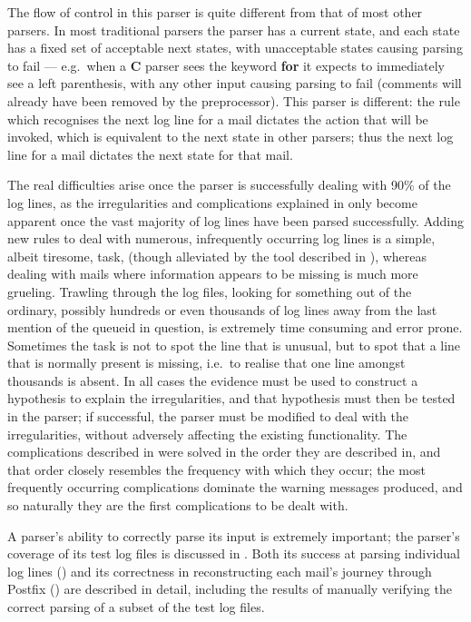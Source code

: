 The flow of control in this parser is quite different from that of most
other parsers.  In most traditional parsers the parser has a current state,
and each state has a fixed set of acceptable next states, with unacceptable
states causing parsing to fail --- e.g.\ when a \textbf{C} parser sees the
keyword \textbf{for} it expects to immediately see a left parenthesis, with
any other input causing parsing to fail (comments will already have been
removed by the preprocessor).  This parser is different: the rule which
recognises the next log line for a mail dictates the action that will be
invoked, which is equivalent to the next state in other parsers; thus the
next log line for a mail dictates the next state for that mail.

The real difficulties arise once the parser is successfully dealing with
90\% of the log lines, as the irregularities and complications explained in
 only become apparent once the vast majority of
log lines have been parsed successfully.  Adding new rules to deal with
numerous, infrequently occurring log lines is a simple, albeit tiresome,
task, (though alleviated by the tool described in ), whereas dealing with mails where information
appears to be missing is much more grueling.  Trawling through the log
files, looking for something out of the ordinary, possibly hundreds or even
thousands of log lines away from the last mention of the queueid in
question, is extremely time consuming and error prone.  Sometimes the task
is not to spot the line that is unusual, but to spot that a line that is
normally present is missing, i.e.\ to realise that one line amongst
thousands is absent.  In all cases the evidence must be used to construct a
hypothesis to explain the irregularities, and that hypothesis must then be
tested in the parser; if successful, the parser must be modified to deal
with the irregularities, without adversely affecting the existing
functionality.  The complications described in 
were solved in the order they are described in, and that order closely
resembles the frequency with which they occur; the most frequently
occurring complications dominate the warning messages produced, and so
naturally they are the first complications to be dealt with.

A parser's ability to correctly parse its input is extremely important; the
parser's coverage of its test log files is discussed in .  Both its success at parsing individual log lines
() and its correctness in reconstructing each
mail's journey through Postfix () are described
in detail, including the results of manually verifying the correct parsing
of a subset of the test log files.


